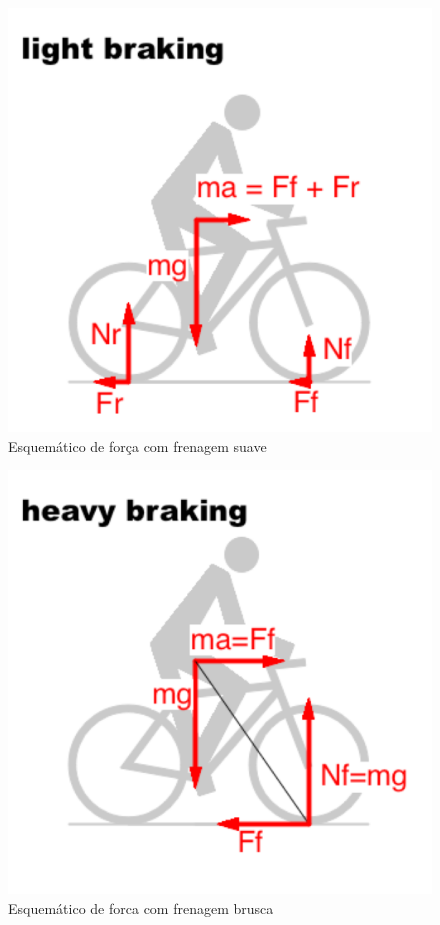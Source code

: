 \graphicspath{{figuras/}}
\begin{figure}[h!]
\centering
\includegraphics[scale=0.80]{esq_forca_com_frenagem_suave.png}
\caption{Esquemático de força com frenagem suave}
\label{img:esq_forca_com_frenagem_suave}
\end{figure}

\graphicspath{{figuras/}}
\begin{figure}[h!]
\centering
\includegraphics[scale=0.80]{esq_forca_com_frenagem_brusca.png}
\caption{Esquemático de forca com frenagem brusca}
\label{img:esq_forca_com_frenagem_brusca}
\end{figure}


